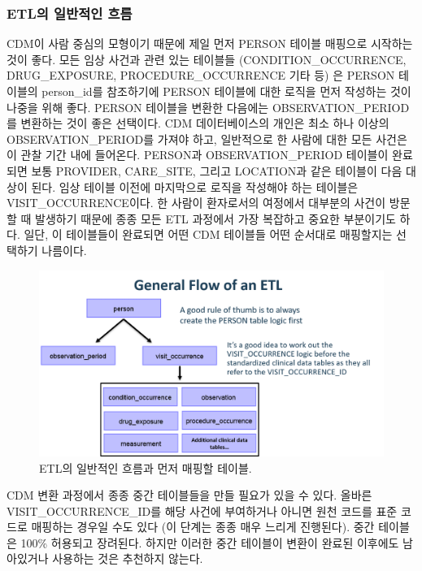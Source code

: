 \documentclass[11pt]{book}
\theoremstyle{definition}
\theoremstyle{definition}
\theoremstyle{definition}
\theoremstyle{remark}
\begin{document}
\subsubsection*{ETL의 일반적인 흐름}\label{etl--}

CDM이 사람 중심의 모형이기 때문에 제일 먼저 PERSON 테이블 매핑으로
시작하는 것이 좋다. 모든 임상 사건과 관련 있는 테이블들
(CONDITION\_OCCURRENCE, DRUG\_EXPOSURE, PROCEDURE\_OCCURRENCE 기타 등)
은 PERSON 테이블의 person\_id를 참조하기에 PERSON 테이블에 대한 로직을
먼저 작성하는 것이 나중을 위해 좋다. PERSON 테이블을 변환한 다음에는
OBSERVATION\_PERIOD를 변환하는 것이 좋은 선택이다. CDM 데이터베이스의
개인은 최소 하나 이상의 OBSERVATION\_PERIOD를 가져야 하고, 일반적으로 한
사람에 대한 모든 사건은 이 관찰 기간 내에 들어온다. PERSON과
OBSERVATION\_PERIOD 테이블이 완료되면 보통 PROVIDER, CARE\_SITE, 그리고
LOCATION과 같은 테이블이 다음 대상이 된다. 임상 테이블 이전에 마지막으로
로직을 작성해야 하는 테이블은 VISIT\_OCCURRENCE이다. 한 사람이
환자로서의 여정에서 대부분의 사건이 방문할 때 발생하기 때문에 종종 모든
ETL 과정에서 가장 복잡하고 중요한 부분이기도 하다. 일단, 이 테이블들이
완료되면 어떤 CDM 테이블들 어떤 순서대로 매핑할지는 선택하기 나름이다.

\begin{figure}

{\centering \includegraphics[width=1\linewidth]{images/ExtractTransformLoad/flowOfEtl} 

}

\caption{ETL의 일반적인 흐름과 먼저 매핑할 테이블.}\label{fig:etlFlow}
\end{figure}

CDM 변환 과정에서 종종 중간 테이블들을 만들 필요가 있을 수 있다. 올바른
VISIT\_OCCURRENCE\_ID를 해당 사건에 부여하거나 아니면 원천 코드를 표준
코드로 매핑하는 경우일 수도 있다 (이 단계는 종종 매우 느리게 진행된다).
중간 테이블은 100\% 허용되고 장려된다. 하지만 이러한 중간 테이블이
변환이 완료된 이후에도 남아있거나 사용하는 것은 추천하지 않는다.
\end{document}
